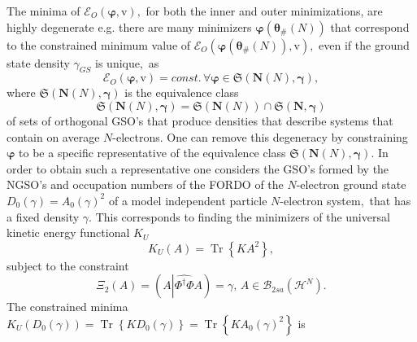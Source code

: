 \documentclass[aps,preprint]{revtex4}%
\begin{document}
The minima of $\mathcal{E}_{O}\left(  \boldsymbol{\varphi,}\mathrm{v}\right)
,$ for both the inner and outer minimizations, are highly degenerate e.g.
there are many minimizers $\boldsymbol{\varphi}\left(  \boldsymbol{\theta
}_{\#}\left(  N\right)  \right)  $ that correspond to the constrained minimum
value of $\mathcal{E}_{O}\left(  \boldsymbol{\varphi}\left(
\boldsymbol{\theta}_{\#}\left(  N\right)  \right)  \boldsymbol{,}%
\mathrm{v}\right)  ,$ even if the ground state density $\gamma_{GS}$ is
unique$,$ as
\begin{equation}
\mathcal{E}_{O}\left(  \boldsymbol{\varphi,}\mathrm{v}\right)
=const.\,\forall\boldsymbol{\varphi\in}\mathfrak{S}\left(  \boldsymbol{N}%
\left(  N\right)  \boldsymbol{,\gamma}\right)  ,
\end{equation}
where $\mathfrak{S}\left(  \boldsymbol{N}\left(  N\right)  \boldsymbol{,\gamma
}\right)  $ is the equivalence class
\begin{equation}
\mathfrak{S}\left(  \boldsymbol{N}\left(  N\right)  \boldsymbol{,\gamma
}\right)  =\mathfrak{S}\left(  \boldsymbol{N}\left(  N\right)  \right)
\cap\mathfrak{S}\left(  \boldsymbol{N,\gamma}\right)
\end{equation}
of sets of orthogonal GSO's that produce densities that describe systems that
contain on average $N$-electrons. One can remove this degeneracy by
constraining $\boldsymbol{\varphi}$ to be a specific representative of the
equivalence class $\mathfrak{S}\left(  \boldsymbol{N}\left(  N\right)
\boldsymbol{,\gamma}\right)  .$ In order to obtain such a representative one
considers the GSO's formed by the NGSO's and occupation numbers of the FORDO
of the $N$-electron ground state $D_{0}\left(  \gamma\right)  =A_{0}\left(
\gamma\right)  ^{2}$ of a model independent particle $N$-electron system$,$
that has a fixed density $\gamma.$ This corresponds to finding the minimizers
of the universal kinetic energy functional $K_{U}$
\begin{equation}
K_{U}\left(  A\right)  =\operatorname{Tr}\left\{  KA^{2}\right\}  ,
\end{equation}
subject to the constraint
\begin{equation}
\Xi_{2}\left(  A\right)  =\left(  A\left\vert \widehat{\Phi^{\dagger}\Phi
}A\right.  \right)  =\gamma,\,A\in\mathcal{B}_{2sa}\left(  \mathcal{H}%
^{N}\right)  .
\end{equation}
The constrained minima $K_{U}\left(  D_{0}\left(  \gamma\right)  \right)
=\operatorname{Tr}\left\{  KD_{0}\left(  \gamma\right)  \right\}
=\operatorname{Tr}\left\{  KA_{0}\left(  \gamma\right)  ^{2}\right\}  $ is
\end{document}
